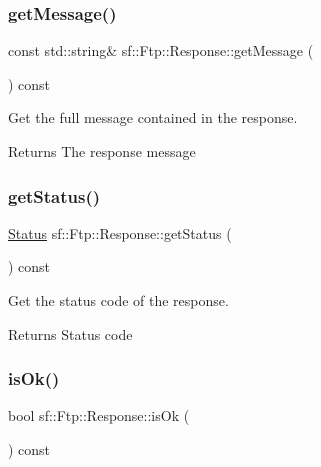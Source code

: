 \subsubsection{\texorpdfstring{get\+Message()}{getMessage()}}
{\footnotesize\ttfamily const std\+::string\& sf\+::\+Ftp\+::\+Response\+::get\+Message (\begin{DoxyParamCaption}{ }\end{DoxyParamCaption}) const}



Get the full message contained in the response. 

\begin{DoxyReturn}{Returns}
The response message 
\end{DoxyReturn}
\mbox{\label{classsf_1_1_ftp_1_1_response_a52bbca9fbf5451157bc055e3d8430c25}} 
\subsubsection{\texorpdfstring{get\+Status()}{getStatus()}}
{\footnotesize\ttfamily \hyperlink{classsf_1_1_ftp_1_1_response_af81738f06b6f571761696291276acb3b}{Status} sf\+::\+Ftp\+::\+Response\+::get\+Status (\begin{DoxyParamCaption}{ }\end{DoxyParamCaption}) const}



Get the status code of the response. 

\begin{DoxyReturn}{Returns}
Status code 
\end{DoxyReturn}
\mbox{\label{classsf_1_1_ftp_1_1_response_a5102552955a2652c1a39e9046e617b36}} 
\subsubsection{\texorpdfstring{is\+Ok()}{isOk()}}
{\footnotesize\ttfamily bool sf\+::\+Ftp\+::\+Response\+::is\+Ok (\begin{DoxyParamCaption}{ }\end{DoxyParamCaption}) const}



